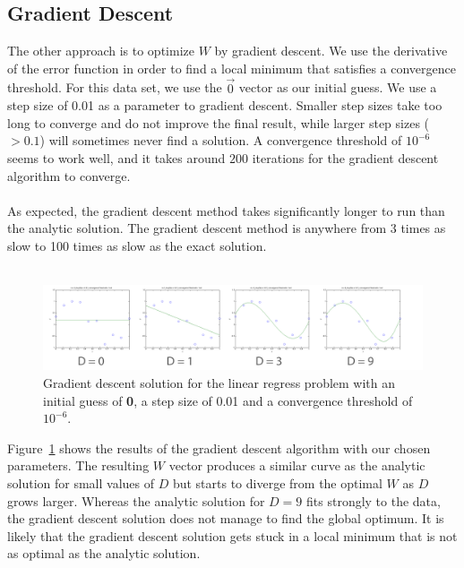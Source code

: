 \documentclass[11pt]{article}   %
\theoremstyle{plain}
\begin{document}
\subsection{Gradient Descent}
The other approach is to optimize $W$ by gradient descent. We use the derivative of the error function in order to find a local minimum that satisfies a convergence threshold. For this data set, we use the \textbf{$\overrightarrow{0}$} vector as our initial guess. We use a step size of 0.01 as a parameter to gradient descent. Smaller step sizes take too long to converge and do not improve the final result, while larger step sizes ($> 0.1$) will sometimes never find a solution. A convergence threshold of $10^{-6}$ seems to work well, and it takes around $200$ iterations for the gradient descent algorithm to converge. \\
\\
\indent As expected, the gradient descent method takes significantly longer to run than the analytic solution. The gradient descent method is anywhere from 3 times as slow to 100 times as slow as the exact solution. \\
\\
\begin{figure}[h!]\label{fig-gradient}
  \caption{Gradient descent solution for the linear regress problem with an initial guess of \textbf{0}, a step size of 0.01 and a convergence threshold of $10^{-6}$.}
  \centering
    \includegraphics[width=1.0\textwidth]{figures/problem_2_2_full.png}
\end{figure}

\indent Figure~\ref{fig-gradient} shows the results of the gradient descent algorithm with our chosen parameters. The resulting $W$ vector produces a similar curve as the analytic solution for small values of $D$ but starts to diverge from the optimal $W$ as $D$ grows larger. Whereas the analytic solution for $D=9$ fits strongly to the data, the gradient descent solution does not manage to find the global optimum. It is likely that the gradient descent solution gets stuck in a local minimum that is not as optimal as the analytic solution.
\end{document}
